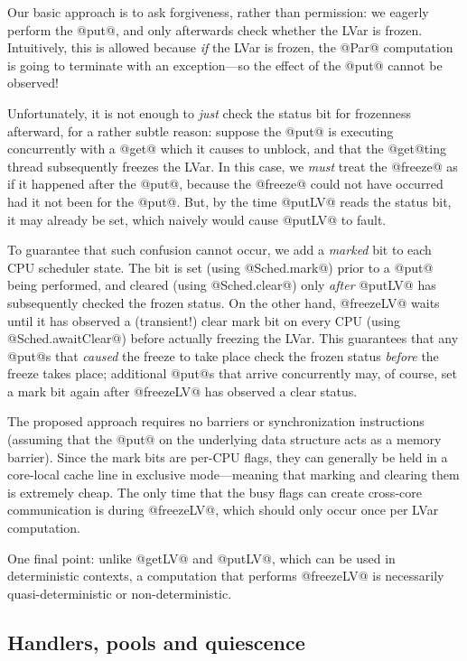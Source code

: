 Our basic approach is to ask forgiveness, rather than permission: we
eagerly perform the @put@, and only afterwards check whether the LVar
is frozen.  Intuitively, this is allowed because \emph{if} the LVar is
frozen, the @Par@ computation is going to terminate with an
exception---so the effect of the @put@ cannot be observed!

Unfortunately, it is not enough to \emph{just} check the status bit
for frozenness afterward, for a rather subtle reason: suppose the
@put@ is executing concurrently with a @get@ which it causes to
unblock, and that the @get@ting thread subsequently freezes the LVar.
In this case, we \emph{must} treat the @freeze@ as if it happened
after the @put@, because the @freeze@ could not have occurred had it
not been for the @put@. But, by the time @putLV@ reads the status bit,
it may already be set, which naively would cause @putLV@ to fault.

To guarantee that such confusion cannot occur, we add a \emph{marked}
bit to each CPU scheduler state.  The bit is set (using @Sched.mark@)
prior to a @put@ being performed, and cleared (using @Sched.clear@)
only \emph{after} @putLV@ has subsequently checked the frozen status.
On the other hand, @freezeLV@ waits until it has observed a
(transient!) clear mark bit on every CPU (using @Sched.awaitClear@)
before actually freezing the LVar.  This guarantees that any @put@s
that \emph{caused} the freeze to take place check the frozen status
\emph{before} the freeze takes place; additional @put@s that arrive
concurrently may, of course, set a mark bit again after @freezeLV@ has
observed a clear status.

The proposed approach requires no barriers or synchronization
instructions (assuming that the @put@ on the underlying data structure
acts as a memory barrier).  Since the mark bits are per-CPU flags,
they can generally be held in a core-local cache line in exclusive
mode---meaning that marking and clearing them is extremely cheap.  The
only time that the busy flags can create cross-core communication is
during @freezeLV@, which should only occur once per LVar computation.

One final point: unlike @getLV@ and @putLV@, which can be used in deterministic
contexts, a computation that performs @freezeLV@ is necessarily
quasi-deterministic or non-deterministic.

\subsection{Handlers, pools and quiescence}

